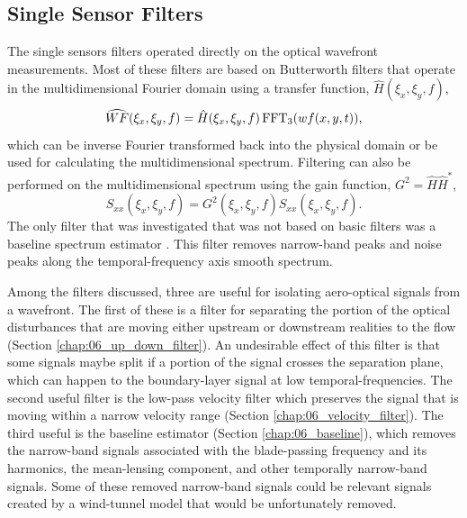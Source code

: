 \subsection{Single Sensor Filters}
The single sensors filters operated directly on the optical wavefront measurements.
Most of these filters are based on Butterworth filters \cite{Butterworth-1930-DvDrjKha} that operate in the multidimensional Fourier domain using a transfer function, $\hat{H}(\xi_x,\xi_y,f)$,
\begin{equation}
  \widehat{WF}(\xi_x,\xi_y,f) = \hat{H}(\xi_x,\xi_y,f)\operatorname{FFT_3}(wf(x,y,t)) \textrm{,}
\end{equation}
which can be inverse Fourier transformed back into the physical domain or be used for calculating the multidimensional spectrum.
Filtering can also be performed on the multidimensional spectrum using the gain function, $G^2 = \hat{H}\hat{H}^*$,
\begin{equation}
  S_{xx}(\xi_x,\xi_y,f) = G^2(\xi_x,\xi_y,f)S_{xx}(\xi_x,\xi_y,f) \textrm{.}
\end{equation}
The only filter that was investigated that was not based on basic filters was a baseline spectrum estimator \cite{Schulze-2012-GmyAqzC7}.
This filter removes narrow-band peaks and noise peaks along the temporal-frequency axis smooth spectrum.

Among the filters discussed, three are useful for isolating aero-optical signals from a wavefront.
The first of these is a filter for separating the portion of the optical disturbances that are moving either upstream or downstream realities to the flow (Section  \ref{chap:06_up_down_filter}).
An undesirable effect of this filter is that some signals maybe split if a portion of the signal crosses the separation plane, which can happen to the boundary-layer signal at low temporal-frequencies.
The second useful filter is the low-pass velocity filter which preserves the signal that is moving within a narrow velocity range (Section \ref{chap:06_velocity_filter}).
The third useful is the baseline estimator (Section \ref{chap:06_baseline}), which removes the narrow-band signals associated with the blade-passing frequency and its harmonics, the mean-lensing component, and other temporally narrow-band signals.
Some of these removed narrow-band signals could be relevant signals created by a wind-tunnel model that would be unfortunately removed.

